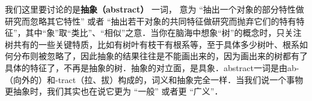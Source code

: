 
\begin{issues}
\issueTODO
\end{issues}

我们这里要讨论的是\textbf{抽象（abstract）} 一词， 意为 “抽出一个对象的部分特性做研究而忽略其它特性” 或者 “抽出若干对象的共同特征做研究而抛弃它们的特有特征”，其中“象”取“类比”、“相似”之意．当你在脑海中想象“树”的概念时，只关注树共有的一些关键特质，比如有树叶有枝干有根系等，至于具体多少树叶、根系如何分布则被忽略了，因此抽象的结果往往是不能画出来的，因为画出来的树都有了具体的特征了，不再是抽象的树．抽象的对立面，是具象．abstract一词是由ab-（向外的）和-tract（拉、拔）构成的，词义和抽象完全一样．当我们说一个事物更抽象时，我们其实也在说它更为 “一般” 或者更 “广义”．

